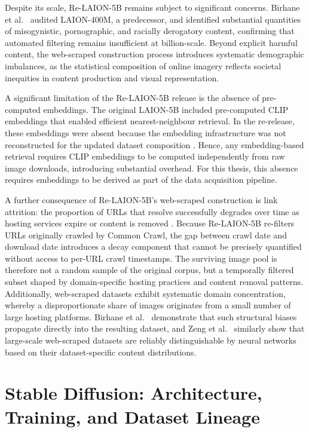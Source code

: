 Despite its scale, Re-LAION-5B remains subject to significant concerns. Birhane et
al.~\cite{Birhane_2021_MultiModalDatasetsMisogynyPornography} audited LAION-400M, a
predecessor, and identified substantial quantities of misogynistic, pornographic, and
racially derogatory content, confirming that automated filtering remains insufficient at billion-scale. Beyond explicit harmful content, the web-scraped construction process introduces systematic demographic imbalances, as the statistical composition of online imagery reflects societal inequities in content production and visual representation.

A significant limitation of the Re-LAION-5B release is the absence of pre-computed embeddings. The original LAION-5B included pre-computed CLIP embeddings that enabled efficient nearest-neighbour retrieval. In the re-release, these embeddings were absent because the embedding infrastructure was not reconstructed for the updated dataset composition \cite{Laion_2024_Relaion5B}. Hence, any embedding-based retrieval requires CLIP embeddings to be computed independently from raw image downloads, introducing substantial overhead. For this thesis, this absence requires embeddings to be derived as part of the data acquisition pipeline.

A further consequence of Re-LAION-5B's web-scraped construction is link attrition: the
proportion of URLs that resolve successfully degrades over time as hosting services expire
or content is removed \cite{Klein_2014_LinkRot}. Because Re-LAION-5B re-filters URLs
originally crawled by Common Crawl, the gap between crawl date and download date introduces
a decay component that cannot be precisely quantified without access to per-URL crawl
timestamps. The surviving image pool is therefore not a random sample of the original corpus, but a
temporally filtered subset shaped by domain-specific hosting practices and content removal
patterns. Additionally, web-scraped datasets exhibit systematic domain concentration, whereby a disproportionate share of images originates from a small number of large hosting platforms. Birhane et
al.~\cite{Birhane_2021_MultiModalDatasetsMisogynyPornography} demonstrate that such
structural biases propagate directly into the resulting dataset, and Zeng et
al.~\cite{Zeng_2024_UnderstandingBiasinLargeScaleVisualDatasets} similarly show that
large-scale web-scraped datasets are reliably distinguishable by neural networks based on
their dataset-specific content distributions.

\section{Stable Diffusion: Architecture, Training, and Dataset Lineage}
\label{sec:stable_diffusion}

